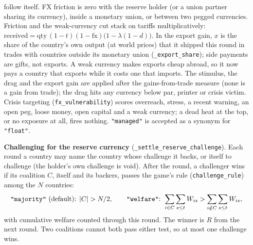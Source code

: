 \documentclass[11pt]{article}
\newcommand{\code}[1]{\texttt{#1}}
\begin{document}
follow itself.
FX friction is zero with the reserve holder (or a union partner sharing its
currency), inside a monetary union, or between two pegged currencies. Friction and the weak-currency cut stack on tariffs
multiplicatively:
$\text{received} = \text{qty}\,(1-t)(1-\mathrm{fx})\big(1-\lambda(1-d)\big)$. In the
export gain, $x$ is the share of the country's own output (at world prices) that it
shipped this round in trades with countries outside its monetary union
(\code{\_export\_share}); side payments are gifts, not exports. A weak currency
makes exports cheap abroad, so it now pays a country that exports while it costs
one that imports. The stimulus, the drag and the export gain are applied after the
gains-from-trade measure (none is a gain from trade); the drag hits any currency
below par, printer or crisis victim.
Crisis targeting (\code{fx\_vulnerability}) scores overreach, stress, a
recent warning, an open peg, loose money, open capital and a weak currency; a dead
heat at the top, or no exposure at all, fires nothing. \code{"managed"} is accepted
as a synonym for \code{"float"}.

\textbf{Challenging for the reserve currency} (\code{\_settle\_reserve\_challenge}).
Each round a country may name the country whose challenge it backs, or itself to
challenge (the holder's own challenge is void). After the round, a challenger
wins if its coalition $C$, itself and its backers, passes the game's rule
(\code{challenge\_rule}) among the $N$ countries:
\[
\text{\code{"majority"} (default): } |C| > N/2,
\qquad
\text{\code{"welfare"}: } \sum_{i\in C}\sum_{s\le t} W_{is} > \sum_{i\notin C}\sum_{s\le t} W_{is},
\]
with cumulative welfare counted through this round. The winner is $R$ from the
next round. Two coalitions cannot both pass either test, so at most one
challenge wins.
\end{document}
